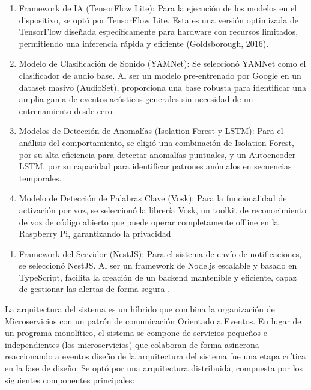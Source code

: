 
\begin{enumerate}
      \item Framework de IA (TensorFlow Lite): Para la ejecución de los modelos en el dispositivo, se optó por TensorFlow Lite. Esta es una versión optimizada de TensorFlow diseñada específicamente para hardware con recursos limitados, permitiendo una inferencia rápida y eficiente (Goldsborough, 2016).
      \item Modelo de Clasificación de Sonido (YAMNet): Se seleccionó YAMNet como el clasificador de audio base. Al ser un modelo pre-entrenado por Google en un dataset masivo (AudioSet), proporciona una base robusta para identificar una amplia gama de eventos acústicos generales sin necesidad de un entrenamiento desde cero.
      \item Modelos de Detección de Anomalías (Isolation Forest y LSTM): Para el análisis del comportamiento, se eligió una combinación de Isolation Forest, por su alta eficiencia para detectar anomalías puntuales, y un Autoencoder LSTM, por su capacidad para identificar patrones anómalos en secuencias temporales.
      \item Modelo de Detección de Palabras Clave (Vosk): Para la funcionalidad de activación por voz, se seleccionó la librería Vosk, un toolkit de reconocimiento de voz de código abierto que puede operar completamente offline en la Raspberry Pi, garantizando la privacidad
\end{enumerate}

\begin{enumerate}
      \item Framework del Servidor (NestJS): Para el sistema de envío de notificaciones, se seleccionó NestJS. Al ser un framework de Node.js escalable y basado en TypeScript, facilita la creación de un backend mantenible y eficiente, capaz de gestionar las alertas de forma segura \cite{sabo_nestjs_2020}.
\end{enumerate}



La arquitectura del sistema es un híbrido que combina la organización de Microservicios con un patrón de comunicación Orientado a Eventos. En lugar de un programa monolítico, el sistema se compone de servicios pequeños e independientes (los microservicios) que colaboran de forma asíncrona reaccionando a eventos diseño de la arquitectura del sistema fue una etapa crítica en la fase de diseño. Se optó por una arquitectura distribuida, compuesta por los siguientes componentes principales:

